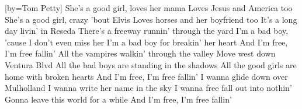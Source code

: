 [by={Tom Petty}]
\beginverse
She's a good girl, loves her mama
Loves Jesus and America too
She's a good girl, crazy 'bout Elvis
Loves horses and her boyfriend too
\endverse
\beginverse 
It's a long day livin' in Reseda
There's a freeway runnin' through the yard
I'm a bad boy, 'cause I don't even miss her
I'm a bad boy for breakin' her heart
\endverse
\beginchorus
And I'm free, I'm free fallin'
\endchorus
\beginverse
All the vampires walkin' through the valley
Move west down Ventura Blvd
All the bad boys are standing in the shadows
All the good girls are home with broken hearts
\endverse
\beginchorus
And I'm free, I'm free fallin'
\endchorus
\beginverse
I wanna glide down over Mulholland
I wanna write her name in the sky
I wanna free fall out into nothin'
Gonna leave this world for a while
\endverse
\beginchorus
And I'm free, I'm free fallin'
\endchorus
\endsong